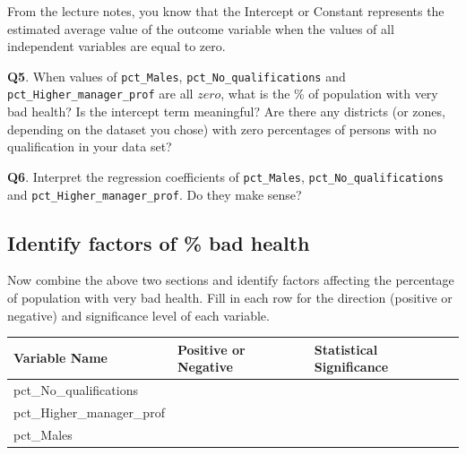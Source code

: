 \documentclass[
  letterpaper,
  DIV=11,
  numbers=noendperiod]{scrreprt}
\newcounter{none} %
\begin{document}
From the lecture notes, you know that the Intercept or Constant
represents the estimated average value of the outcome variable when the
values of all independent variables are equal to zero.

\textbf{Q5}. When values of \texttt{pct\_Males},
\texttt{pct\_No\_qualifications} and \texttt{pct\_Higher\_manager\_prof}
are all \(zero\), what is the \% of population with very bad health? Is
the intercept term meaningful? Are there any districts (or zones,
depending on the dataset you chose) with zero percentages of persons
with no qualification in your data set?

\textbf{Q6}. Interpret the regression coefficients of
\texttt{pct\_Males}, \texttt{pct\_No\_qualifications} and
\texttt{pct\_Higher\_manager\_prof}. Do they make sense?

\subsection{Identify factors of \% bad
health}\label{identify-factors-of-bad-health}

Now combine the above two sections and identify factors affecting the
percentage of population with very bad health. Fill in each row for the
direction (positive or negative) and significance level of each
variable.

{\def\LTcaptype{none} %
\begin{longtable}[]{@{}
  >{\raggedright\arraybackslash}p{}
  >{\raggedright\arraybackslash}p{}
  >{\raggedright\arraybackslash}p{}@{}}
\toprule\noalign{}
\begin{minipage}[b]{\linewidth}\raggedright
Variable Name
\end{minipage} & \begin{minipage}[b]{\linewidth}\raggedright
Positive or Negative
\end{minipage} & \begin{minipage}[b]{\linewidth}\raggedright
Statistical Significance
\end{minipage} \\
\midrule\noalign{}
\endhead
\bottomrule\noalign{}
\endlastfoot
pct\_No\_qualifications & & \\
pct\_Higher\_manager\_prof & & \\
pct\_Males & & \\
\end{longtable}
}
\end{document}
